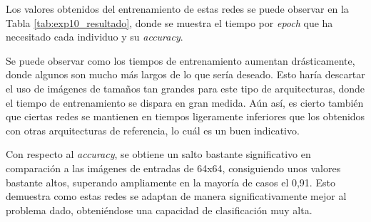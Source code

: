 Los valores obtenidos del entrenamiento de estas redes se puede observar en la Tabla \ref{tab:exp10_resultado}, donde se muestra el tiempo por \textit{epoch} que ha necesitado cada individuo y su \textit{accuracy}.

Se puede observar como los tiempos de entrenamiento aumentan drásticamente, donde algunos son mucho más largos de lo que sería deseado. Esto haría descartar el uso de imágenes de tamaños tan grandes para este tipo de arquitecturas, donde el tiempo de entrenamiento se dispara en gran medida. Aún así, es cierto también que ciertas redes se mantienen en tiempos ligeramente inferiores que los obtenidos con otras arquitecturas de referencia, lo cuál es un buen indicativo. 

Con respecto al \textit{accuracy}, se obtiene un salto bastante significativo en comparación a las imágenes de entradas de 64x64, consiguiendo unos valores bastante altos, superando ampliamente en la mayoría de casos el 0,91. Esto demuestra como estas redes se adaptan de manera significativamente mejor al problema dado, obteniéndose una capacidad de clasificación muy alta.
